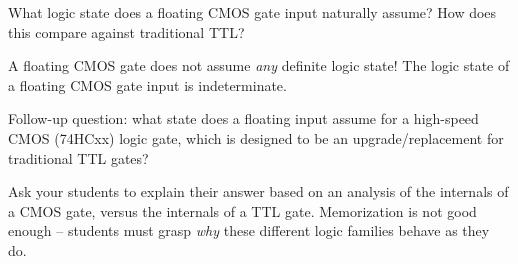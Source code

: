 

What logic state does a floating CMOS gate input naturally assume?  How does this compare against traditional TTL?







A floating CMOS gate does not assume {\it any} definite logic state!  The logic state of a floating CMOS gate input is indeterminate.

\vskip 10pt

Follow-up question: what state does a floating input assume for a high-speed CMOS (74HCxx) logic gate, which is designed to be an upgrade/replacement for traditional TTL gates?







Ask your students to explain their answer based on an analysis of the internals of a CMOS gate, versus the internals of a TTL gate.  Memorization is not good enough -- students must grasp {\it why} these different logic families behave as they do.





